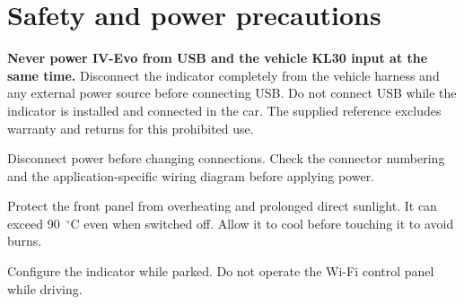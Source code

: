 \chapter{Safety and power precautions}\label{ch:evo-safety}
\textbf{Never power IV-Evo from USB and the vehicle KL30 input at the same time.}
Disconnect the indicator completely from the vehicle harness and any external power source before connecting USB. Do not connect USB while the indicator is installed and connected in the car. The supplied reference excludes warranty and returns for this prohibited use.

Disconnect power before changing connections. Check the connector numbering and the application-specific wiring diagram before applying power.

Protect the front panel from overheating and prolonged direct sunlight. It can exceed 90~$^\circ$C even when switched off. Allow it to cool before touching it to avoid burns.

Configure the indicator while parked. Do not operate the Wi-Fi control panel while driving.
